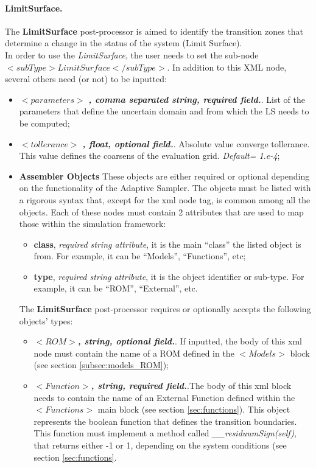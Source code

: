 \paragraph{LimitSurface.}
\label{LimitSurface}
The \textbf{LimitSurface} post-processor is aimed to identify the transition zones that determine a change in the status of the system (Limit Surface). 
\\In order to use the   \textit{LimitSurface}, the user needs to set the sub-node $<subType>LimitSurface</subType>$. In addition to this XML node, several others need (or not) to be inputted:
\begin{itemize}
\item $<parameters>$ \textbf{\textit{, comma separated string, required field.}}. List of the parameters that define the uncertain domain and from which the LS needs to be computed;
\item $<tollerance>$ \textbf{\textit{, float, optional field.}}. Absolute value converge tollerance. This value defines the coarsens  of the evaluation grid. \textit{Default= 1.e-4};
   \item \textbf{Assembler Objects} These objects are either required or optional depending on the functionality of the Adaptive Sampler. The objects must be listed with a rigorous syntax that, except for the xml node tag, is common among all the objects.  
Each of these nodes  must contain 2 attributes that are used to map those within the simulation framework:
   \begin{itemize}
     \item \textbf{class}, \textit{required string attribute}, it is the main ``class'' the listed object is from. For example, it can be ``Models'', ``Functions'', etc;
     \item \textbf{type},  \textit{required string attribute}, it is the object identifier or sub-type. For example, it can be ``ROM'', ``External'', etc.
    \end{itemize}
   The \textbf{LimitSurface} post-processor requires or optionally accepts the following objects' types:
   \begin{itemize}
     \item $<ROM>$\textbf{\textit{, string, optional  field.}}. If inputted, the body of this xml node must contain the name of a ROM defined in the $<Models>$ block (see section \ref{subsec:models_ROM});
       \item $<Function>$\textbf{\textit{, string, required field.}}.The body of this xml block needs to contain the name of an External Function defined within the $<Functions>$ main block (see section \ref{sec:functions}). This object represents the boolean function that defines the transition boundaries. This function must implement a method called \textit{\_\_residuumSign(self)}, that returns either -1 or 1, depending on the system conditions (see section \ref{sec:functions}.
    \end{itemize}
\end{itemize}

